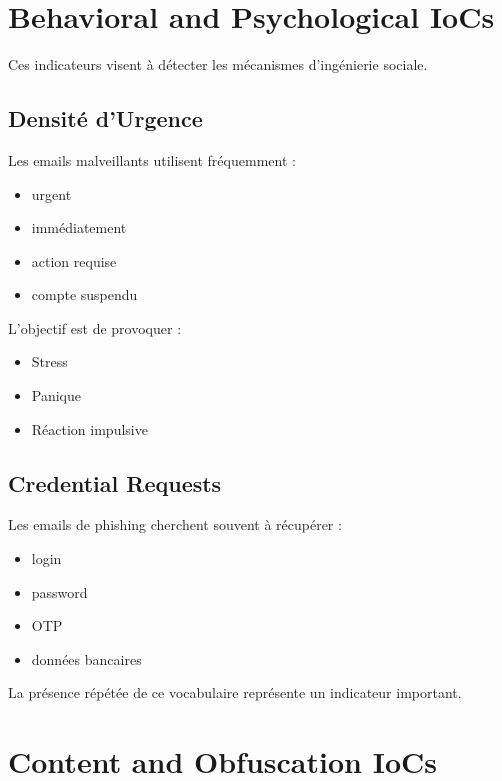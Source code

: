 \documentclass[12pt,a4paper]{article}
\begin{document}
\section{Behavioral and Psychological IoCs}

Ces indicateurs visent à détecter les mécanismes d'ingénierie sociale.

\subsection{Densité d'Urgence}

Les emails malveillants utilisent fréquemment :
\begin{itemize}
    \item urgent
    \item immédiatement
    \item action requise
    \item compte suspendu
\end{itemize}

L'objectif est de provoquer :
\begin{itemize}
    \item Stress
    \item Panique
    \item Réaction impulsive
\end{itemize}

\subsection{Credential Requests}

Les emails de phishing cherchent souvent à récupérer :
\begin{itemize}
    \item login
    \item password
    \item OTP
    \item données bancaires
\end{itemize}

La présence répétée de ce vocabulaire représente un indicateur important.

\section{Content and Obfuscation IoCs}
\end{document}
